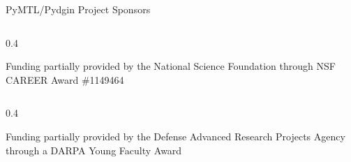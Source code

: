 \begin{frame}{PyMTL/Pydgin Project Sponsors}
\begin{cbxcols}
  \begin{column}{0.4\tw}

    \vspace{0.1in}\centering

    Funding partially provided by the National Science Foundation through
    NSF CAREER Award \#1149464

  \end{column}

  \begin{column}{0.4\tw}
    \vspace{0.18in}

    \vspace{0.15in}\centering

    Funding partially provided by the Defense Advanced Research Projects
    Agency through a DARPA Young Faculty Award

  \end{column}

\end{cbxcols}
\end{frame}

